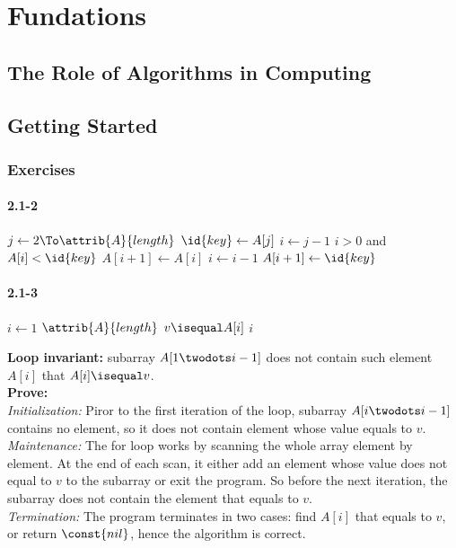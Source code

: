 \documentclass[a4paper, 11pt]{report}
\begin{document}
	\tableofcontents
	\part{Fundations}
		\chapter{The Role of Algorithms in Computing}
		\chapter{Getting Started}
			\section*{Exercises}
				\subsection{2.1-2}
					\begin{codebox}
						\li	\For $j \gets 2 \To \attrib{A}{length}$
							\Do
						\li		$\id{key} \gets A[j]$
						\li		$i \gets j-1$
						\li		\While $i > 0$ and $A[i] < \id{key}$
								\Do
						\li			$A[i+1] \gets A[i]$
						\li			$i \gets i-1$
								\End
						\li		$A[i+1] \gets \id{key}$
							\End
					\end{codebox}
				\subsection{2.1-3}
					\begin{codebox}
						\Procname{$\proc{Linear-Search}(A, v)$} 
						\li	\For $i \gets 1$ \To $\attrib{A}{length}$
							\Do
						\li		\If $v \isequal A[i]$
								\Then 
						\li			\Return $i$
								\End
							\End
					\li	\Return \const{nil}
					\end{codebox}
					\textbf{Loop invariant:} subarray $A[1 \twodots i-1]$ does not contain such element $A[i]$
					that $A[i] \isequal v$.	\\
					\textbf{Prove:}	\\
					\textit{Initialization:} Piror to the first iteration of the loop, subarray $A[i \twodots i-1]$
					contains no element, so it does not contain element whose value equals to $v$.	\\
					\textit{Maintenance:} The for loop works by scanning the whole array element by element. At the
					end of each scan, it either add an element whose value does not equal to $v$ to the subarray or
					exit the program. So before the next iteration, the subarray does not contain the element that
					equals to $v$.	\\
					\textit{Termination:} The program terminates in two cases: find $A[i]$ that equals to $v$, or 
					return $$, hence the algorithm is correct.
\end{document}
